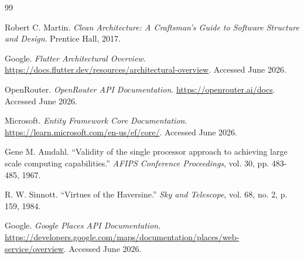 \begin{thebibliography}{99}

Robert C. Martin. \textit{Clean Architecture: A Craftsman's Guide to Software Structure and Design}. Prentice Hall, 2017.

Google. \textit{Flutter Architectural Overview}. \url{https://docs.flutter.dev/resources/architectural-overview}. Accessed June 2026.

OpenRouter. \textit{OpenRouter API Documentation}. \url{https://openrouter.ai/docs}. Accessed June 2026.

Microsoft. \textit{Entity Framework Core Documentation}. \url{https://learn.microsoft.com/en-us/ef/core/}. Accessed June 2026.

Gene M. Amdahl. ``Validity of the single processor approach to achieving large scale computing capabilities.'' \textit{AFIPS Conference Proceedings}, vol. 30, pp. 483-485, 1967.

R. W. Sinnott. ``Virtues of the Haversine.'' \textit{Sky and Telescope}, vol. 68, no. 2, p. 159, 1984.

Google. \textit{Google Places API Documentation}. \url{https://developers.google.com/maps/documentation/places/web-service/overview}. Accessed June 2026.

\end{thebibliography}

